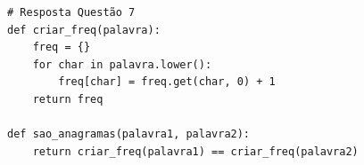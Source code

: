 \ifmostrarGabarito
\begin{verbatim}
# Resposta Questão 7
def criar_freq(palavra):
    freq = {}
    for char in palavra.lower():
        freq[char] = freq.get(char, 0) + 1
    return freq

def sao_anagramas(palavra1, palavra2):
    return criar_freq(palavra1) == criar_freq(palavra2)
\end{verbatim}
\fi
